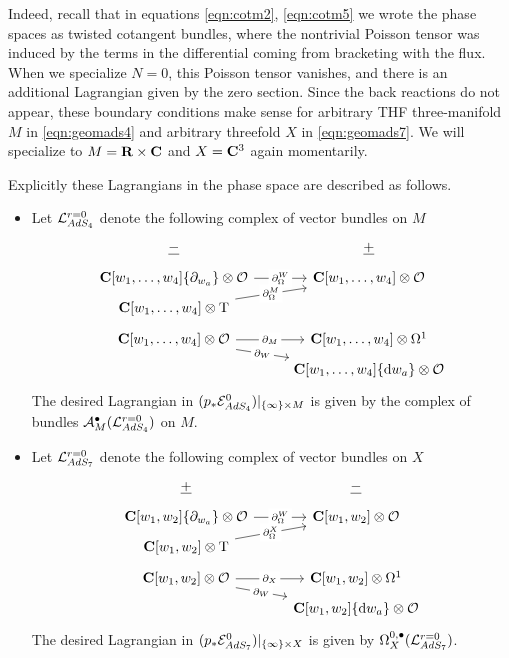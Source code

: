 \documentclass[../main.tex]{subfiles}
\begin{document}
Indeed, recall that in equations \eqref{eqn:cotm2}, \eqref{eqn:cotm5} we wrote the phase spaces as twisted cotangent bundles, where the nontrivial Poisson tensor was induced by the terms in the differential coming from bracketing with the flux. When we specialize $N=0$, this Poisson tensor vanishes, and there is an additional Lagrangian given by the zero section.
Since the back reactions do not appear, these boundary conditions make sense for arbitrary THF three-manifold $M$ in \eqref{eqn:geomads4} and arbitrary threefold $X$ in \eqref{eqn:geomads7}.
We will specialize to $M = \mathbf{R} \times \mathbf{C}$ and $X =\mathbf{C}^3$ again momentarily.

Explicitly these Lagrangians in the phase space are described as follows.
\begin{itemize}
\item Let $\mathcal{L}_{AdS_4}^{r=0}$ denote the following complex of vector bundles on $M$
 \begin{equation}
 \begin{tikzcd}[row sep = 1 ex]
   \ul{-} & \ul{+} \\
\C[w_1,\ldots, w_4] \{\partial_{w_a}\} \otimes \mc{O}\ar[r, "\del^W_\Omega" description] &\C[w_1,\ldots, w_4]  \otimes \mc O \\
\C[w_1,\ldots, w_4]   \otimes \T\ar[ur, "\del^M_\Omega" description] \\
\C[w_1,\ldots, w_4] \otimes \mc{O}\ar[r, "\del_M" description]\ar[dr, "\del_W" description] & \C[w_1,\ldots, w_4]\otimes \Omega^1 \\ & \C[w_1,\ldots, w_4] \{\d w_a\}  \otimes \mc O
\end{tikzcd}
\end{equation}
The desired Lagrangian in $(p_*\mathcal{E}^{0}_{AdS_4})|_{\{\infty\} \times M}$ is given by the complex of bundles $\mathcal A^\bullet_{M}(\mathcal{L}_{AdS_4}^{r=0})$ on $M$.

\item Let $\mathcal{L}_{AdS_7}^{r=0}$ denote the following complex of vector bundles on $X$
 \begin{equation}
 \begin{tikzcd}[row sep = 1 ex]
   \ul{+} & \ul{-} \\
\C[w_1, w_2] \{\partial_{w_a}\} \otimes \mc{O}\ar[r, "\del^W_\Omega" description] &\C[w_1,w_2]  \otimes \mc O \\
\C[w_1, w_2]   \otimes \T\ar[ur, "\del^X_\Omega" description] \\
\C[w_1, w_2] \otimes \mc{O}\ar[r, "\del_X" description]\ar[dr, "\del_W" description] & \C[w_1,w_2]\otimes \Omega^1 \\ & \C[w_1, w_2] \{\d w_a\}  \otimes \mc O
\end{tikzcd}
\end{equation}
The desired Lagrangian in $(p_*\mathcal{E}^{0}_{AdS_7})|_{\{\infty\} \times X}$ is given by $\Omega^{0,\bullet}_{X} (\mathcal{L}_{AdS_7}^{r=0})$.
\end{itemize}
\end{document}
